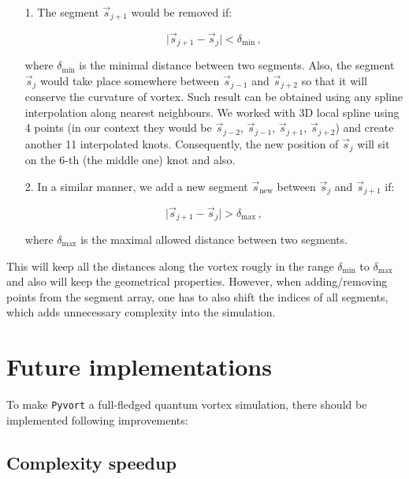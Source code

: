 \begin{itemize}
	\item[1.] The segment $\vec{s}_{j+1}$ would be removed if:

	\begin{equation}
	\vert \vec{s}_{j+1} - \vec{s}_j \vert < \delta_{\text{min}}\,,
	\end{equation}

	where $\delta_{\text{min}}$ is the minimal distance between two segments. Also, the segment $\vec{s}_j$ would take place somewhere between $\vec{s}_{j-1}$ and $\vec{s}_{j+2}$ so that it will conserve the curvature of vortex. Such result can be obtained using any spline interpolation along nearest neighbours. We worked with 3D local spline using 4 points (in our context they would be $\vec{s}_{j-2}$, $\vec{s}_{j-1}$, $\vec{s}_{j+1}$, $\vec{s}_{j+2}$) and create another 11 interpolated knots.
	Consequently, the new position of $\vec{s}_j$ will sit on the 6-th (the middle one) knot and also.

	\item[2.] In a similar manner, we add a new segment $\vec{s}_{\text{new}}$ between $\vec{s}_{j}$ and $\vec{s}_{j+1}$ if:

	\begin{equation}
	\vert \vec{s}_{j+1} - \vec{s}_j \vert > \delta_{\text{max}}\,,
	\end{equation}

	where $\delta_{\text{max}}$ is the maximal allowed distance between two segments.
\end{itemize}

This will keep all the distances along the vortex rougly in the range $\delta_{\text{min}}$ to $\delta_{\text{max}}$ and also will keep the geometrical properties. However, when adding/removing points from the segment array, one has to also shift the indices of all segments, which adds unnecessary complexity into the simulation.

\section{Future implementations}

To make \texttt{Pyvort} a full-fledged quantum vortex simulation, there should be implemented following improvements:

\subsection*{Complexity speedup}

